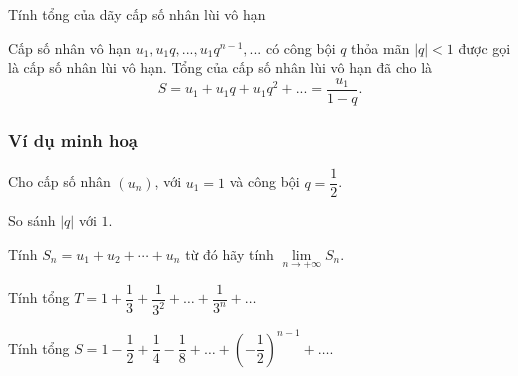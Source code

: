 \begin{dang}{Tính tổng của dãy cấp số nhân lùi vô hạn}
	\begin{dn}
		Cấp số nhân vô hạn $u_1, u_1q,...,u_1q^{n-1},...$ có công bội $q$ thỏa mãn $|q|<1$ được gọi là cấp số nhân lùi vô hạn. 
		Tổng của cấp số nhân lùi vô hạn đã cho là $$S=u_1+u_1q+u_1q^2+...=\dfrac{u_1}{1-q}.$$
	\end{dn}
\end{dang}
\subsubsection{Ví dụ minh hoạ}
\begin{vd}%
	Cho cấp số nhân $(u_n)$, với $u_1=1$ và công bội $q=\dfrac{1}{2}$.
	\begin{enumEX}{1}
		\item So sánh $\left|q\right|$ với $1$.
		\item Tính $S_n=u_1+u_2+\cdots+u_n$ từ đó hãy tính $\lim \limits_{n \to +\infty}S_n$.
	\end{enumEX}
\end{vd}
\begin{vd}%
	Tính tổng $T=1+\dfrac{1}{3}+\dfrac{1}{3^2}+\ldots+\dfrac{1}{3^n}+\ldots$
\end{vd}
\begin{vd}
	Tính tổng $S=1-\dfrac{1}{2}+\dfrac{1}{4}-\dfrac{1}{8}+\ldots+\left(-\dfrac{1}{2}\right)^{n-1}+\ldots$.
\end{vd}

